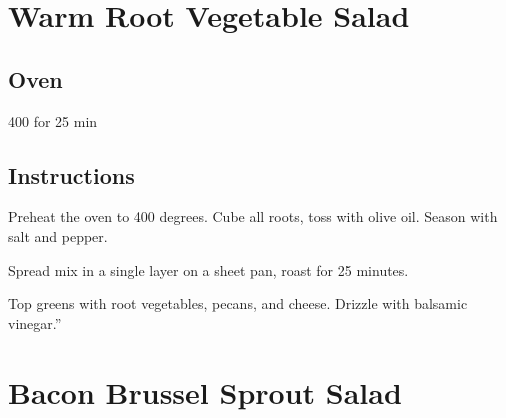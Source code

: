 \documentclass[letterpaper,10pt,english]{sphinxmanual}
\begin{document}
\chapter{Warm Root Vegetable Salad}
\label{\detokenize{wrv_salad:warm-root-vegetable-salad}}\label{\detokenize{wrv_salad::doc}}
%
\begin{sphinxVerbatim}[commandchars=\\\{\}]
  

  

  

   

     

     

    

  

 

    

   
\end{sphinxVerbatim}


\section{Oven}
\label{\detokenize{wrv_salad:oven}}
400 for 25 min


\section{Instructions}
\label{\detokenize{wrv_salad:instructions}}
Preheat the oven to 400 degrees. Cube all roots, toss with olive oil. Season with salt and pepper.

Spread mix in a single layer on a sheet pan, roast for 25 minutes.

Top greens with root vegetables, pecans, and cheese. Drizzle with balsamic vinegar.”


\chapter{Bacon Brussel Sprout Salad}
\label{\detokenize{baconbrussel:bacon-brussel-sprout-salad}}\label{\detokenize{baconbrussel::doc}}
\end{document}
